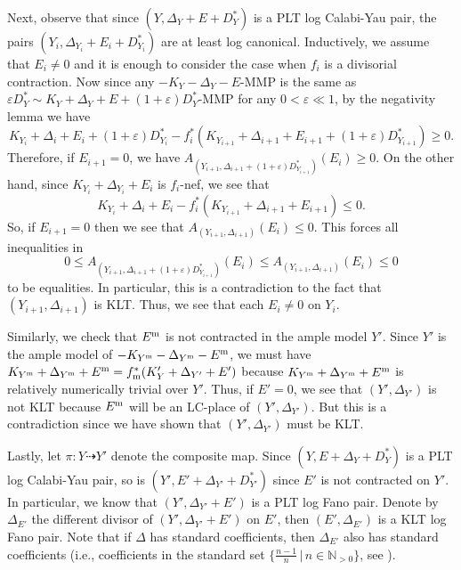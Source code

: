 \documentclass[11pt,reqno]{amsart}
\newcommand{\N}{\mathbb{N}}
\numberwithin{equation}{section}
\theoremstyle{definition}
\begin{document}
Next, observe that since $(Y, \Delta_Y + E + D^{*}_Y)$ is a PLT log Calabi-Yau pair, the pairs $(Y_i, \Delta_{Y_i} + E_i + D^{*}_{Y_i})$ are at least log canonical. Inductively, we assume that $E_i \neq 0$ and it is enough to consider the case when $f_i$ is a divisorial contraction.
Now since any $-K_Y - \Delta_Y  - E$-MMP is the same as $\varepsilon D^* _ Y \sim K_ Y + \Delta_Y + E + (1+ \varepsilon) D^* _Y$-MMP for any $0 < \varepsilon  \ll 1$, by the negativity lemma we have
\begin{equation} \label{pltlcyequation} K_{Y_i} + \Delta_i + E_i + (1 + \varepsilon) D^* _{Y_i} - f_i ^* (K_{Y_{i+1}} + \Delta_{i+1} + E_{i+1} + (1+ \varepsilon) D_{Y_{i+1}} ^*) \geq  0. \end{equation}
Therefore, if $E_{i+1} = 0$, we have $A_{(Y_{i+1}, \Delta_{i+1} + ( 1 + \varepsilon)D^* _{Y_{i+1}})} (E_i) \geq 0$. On the other hand, since $K_{Y_i} + \Delta_{Y_{i}} + E_i$ is $f_i$-nef, we see that
\[  K_{Y_i} + \Delta_i + E_i - f_i ^* (K_{Y_{i+1}} + \Delta_{i+1} + E_{i+1}) \leq  0.  \]
  So, if $E_{i+1} = 0$ then we see that $A_{(Y_{i+1}, \Delta_{i+1})}(E_i) \leq 0$. This forces all inequalities in
  \[0 \leq A_{(Y_{i+1}, \Delta_{i+1} + ( 1 + \varepsilon)D^* _{Y_{i+1}})} (E_i) \leq A_{(Y_{i+1}, \Delta_{i+1})}(E_i) \leq 0 \]
  to be equalities. In particular, this is a contradiction to the fact that $(Y_{i+1}, \Delta_{i+1})$ is KLT. Thus, we see that each $E_i \neq 0$ on $Y_i$.

  Similarly, we check that $E^{\rm m}$ is not contracted in the ample model $Y'$. Since $Y'$ is the ample model of $-K_{Y^{\rm m}} - \Delta_{Y^{\rm m}} - E^{\rm m}$, we must have $ K_{Y^{\rm m}} +\Delta_{Y^{\rm m}} + E^{\rm m}  = f_{\rm m} ^*(K_Y' + \Delta_{Y'} + E')$ because $K_{Y^{\rm m}} +\Delta_{Y^{\rm m}}+  E^{\rm m}$ is relatively numerically trivial over $Y'$. Thus, if $E' = 0$, we see that $(Y', \Delta_{Y'})$ is not KLT because $E^{\rm m}$ will be an LC-place of $(Y', \Delta_{Y'})$. But this is a contradiction since we have shown that $(Y', \Delta_{Y'})$ must be KLT. 


  
  

Lastly, let $\pi: Y \dashrightarrow Y'$ denote the composite map. Since $(Y,E+ \Delta_Y + D_Y^*)$ is a PLT log Calabi-Yau pair, so is $(Y', E' + \Delta_{Y'} + D_{Y'}^*)$ since $E'$ is not contracted on $Y'$. In particular, we know that $(Y', \Delta_{Y'} + E')$ is a PLT log Fano pair. Denote by $\Delta_{E'}$ the different divisor of $(Y',\Delta_{Y'}+E')$ on $E'$, then $(E',\Delta_{E'})$ is a KLT log Fano pair. Note that if $\Delta$ has standard coefficients, then $\Delta_{E'}$ also has standard coefficients (i.e., coefficients in the standard set $\{ \frac{n-1}{n} \,| \, n \in \N _{>0} \}$, see \cite[Lemma~4.1]{HaconMckernanXuACCforLCT}).
\end{document}
